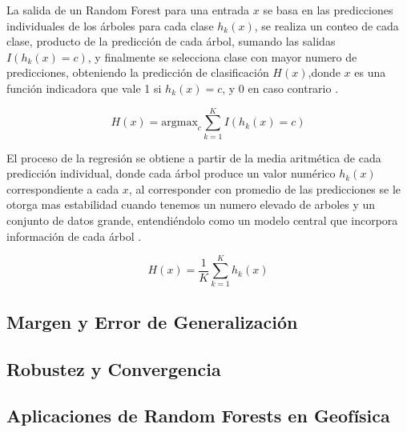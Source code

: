 			
			 La salida de un Random Forest para una entrada $x$ se basa en las predicciones individuales de los árboles para cada clase $h_{k}(x)$, se realiza un conteo de cada clase, producto de la predicción de cada árbol, sumando las salidas $I(h_{k}(x)=c)$, y finalmente se selecciona clase con mayor numero de predicciones, obteniendo la predicción de clasificación $H(x)$,donde $x$ es una función indicadora que vale 1 si $h_{k}(x)=c$, y $0$ en caso contrario \citep{breiman2001}.
			
			\begin{equation}
				H(x) = \text{argmax}_c \sum_{k=1}^K I(h_k(x) = c)
			\end{equation}

			
			El proceso de la regresión se obtiene a partir de la media aritmética de cada predicción individual, donde cada árbol produce un valor numérico $h_{k}(x)$ correspondiente a cada $x$, al corresponder con promedio de las predicciones se le otorga mas estabilidad cuando tenemos un numero elevado de arboles  y un conjunto de datos grande, entendiéndolo como un modelo central que incorpora información de cada árbol \citep{breiman2001}. 
			
			\begin{equation}
					H(x) = \frac{1}{K} \sum_{k=1}^K h_k(x)	
			\end{equation}

		\subsection{Margen y Error de Generalización}
		\subsection{Robustez y Convergencia}
		\subsection{Aplicaciones de Random Forests en Geofísica}
	